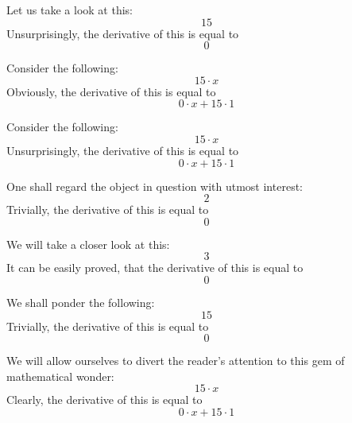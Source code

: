 \documentclass{article}
\begin{document}
Let us take a look at this:
\begin{equation}
15 
\end{equation}
Unsurprisingly, the derivative of this is equal to
\begin{equation}
0 
\end{equation}

Consider the following:
\begin{equation}
15 \cdot x 
\end{equation}
Obviously, the derivative of this is equal to
\begin{equation}
0 \cdot x + 15 \cdot 1 
\end{equation}

Consider the following:
\begin{equation}
15 \cdot x 
\end{equation}
Unsurprisingly, the derivative of this is equal to
\begin{equation}
0 \cdot x + 15 \cdot 1 
\end{equation}

One shall regard the object in question with utmost interest:
\begin{equation}
2 
\end{equation}
Trivially, the derivative of this is equal to
\begin{equation}
0 
\end{equation}

We will take a closer look at this:
\begin{equation}
3 
\end{equation}
It can be easily proved, that the derivative of this is equal to
\begin{equation}
0 
\end{equation}

We shall ponder the following:
\begin{equation}
15 
\end{equation}
Trivially, the derivative of this is equal to
\begin{equation}
0 
\end{equation}

We will allow ourselves to divert the reader's attention to this gem of mathematical wonder:
\begin{equation}
15 \cdot x 
\end{equation}
Clearly, the derivative of this is equal to
\begin{equation}
0 \cdot x + 15 \cdot 1 
\end{equation}
\end{document}
